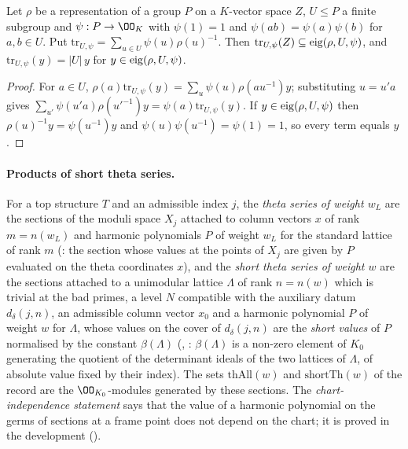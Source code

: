 \begin{lemma}\label{pf:onto2:avg}
Let $\rho$ be a representation of a group $P$ on a $K$-vector space $Z$, $U\le P$ a finite subgroup and $\psi:P\to\OO_K$ with
$\psi(1)=1$ and $\psi(ab)=\psi(a)\psi(b)$ for $a,b\in U$. Put $\mathrm{tr}_{U,\psi}=\sum_{u\in U}\psi(u)\rho(u)^{-1}$. Then
$\mathrm{tr}_{U,\psi}(Z)\subseteq\operatorname{eig}(\rho,U,\psi)$, and $\mathrm{tr}_{U,\psi}(y)=|U|\,y$ for $y\in\operatorname{eig}(\rho,U,\psi)$.
\end{lemma}

\begin{proof}
For $a\in U$, $\rho(a)\mathrm{tr}_{U,\psi}(y)=\sum_u\psi(u)\rho(au^{-1})y$; substituting $u=u'a$ gives
$\sum_{u'}\psi(u'a)\rho(u'^{-1})y=\psi(a)\mathrm{tr}_{U,\psi}(y)$. If $y\in\operatorname{eig}(\rho,U,\psi)$ then $\rho(u)^{-1}y=\psi(u^{-1})y$
and $\psi(u)\psi(u^{-1})=\psi(1)=1$, so every term equals $y$.
\end{proof}

\paragraph{Products of short theta series.} For a top structure $T$ and an admissible index $j$, the \emph{theta series of
weight $w_L$} are the sections of the moduli space $X_j$ attached to column vectors $x$ of rank $m=n(w_L)$ and harmonic
polynomials $P$ of weight $w_L$ for the standard lattice of rank $m$ (: the section whose values
at the points of $X_j$ are given by $P$ evaluated on the theta coordinates $x$), and the \emph{short theta series of weight $w$}
are the sections attached to a unimodular lattice $\Lambda$ of rank $n=n(w)$ which is trivial at the bad primes, a level $N$
compatible with the auxiliary datum $d_\delta(j,n)$, an admissible column vector $x_0$ and a harmonic polynomial $P$ of weight $w$
for $\Lambda$, whose values on the cover of $d_\delta(j,n)$ are the \emph{short values} of $P$ normalised by the constant
$\beta(\Lambda)$ (, : $\beta(\Lambda)$ is a non-zero element of
$K_0$ generating the quotient of the determinant ideals of the two lattices of $\Lambda$, of absolute value fixed by their index).
The sets $\mathrm{thAll}(w)$ and $\mathrm{shortTh}(w)$ of the record are the $\OO_{K_0}$-modules generated by these sections. The
\emph{chart-independence statement} says that the value of a harmonic polynomial on the germs of sections at a frame point does
not depend on the chart; it is proved in the development ().

